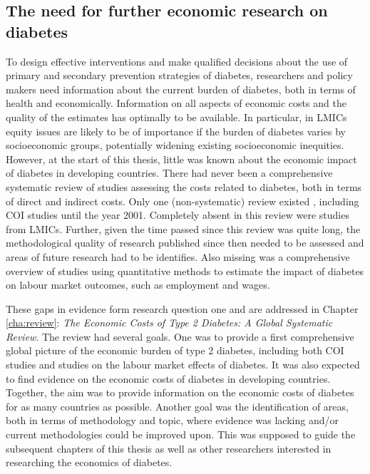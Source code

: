 \subsection{The need for further economic research on diabetes}

To design effective interventions and make qualified decisions about the use of primary and secondary prevention strategies of diabetes, researchers and policy makers need information about the current burden of diabetes, both in terms of health and economically. Information on all aspects of economic costs and the quality of the estimates has optimally to be available. In particular, in \acp{LMIC} equity issues are likely to be of importance if the burden of diabetes varies by socioeconomic groups, potentially widening existing socioeconomic inequities. However, at the start of this thesis, little was known about the economic impact of diabetes in developing countries. There had never been a comprehensive systematic review of studies assessing the costs related to diabetes, both in terms of direct and indirect costs. Only one (non-systematic) review existed \parencite{Ettaro2004}, including \ac{COI} studies  until the year 2001. Completely absent in this review were studies from \acp{LMIC}. Further, given the time passed since this review was quite long, the methodological quality of research published since then needed to be assessed and areas of future research had to be identifies. Also missing was a comprehensive overview of studies using quantitative methods to estimate the impact of diabetes on labour market outcomes, such as employment and wages.

These gaps in evidence form research question one and are addressed in Chapter \ref{cha:review}: \textit{The Economic Costs of Type 2 Diabetes: A Global Systematic Review}. The review had several goals. One was to provide a first comprehensive global picture of the economic burden of type 2 diabetes, including both \ac{COI} studies and studies on the labour market effects of diabetes. It was also expected to find evidence on the economic costs of diabetes in developing countries. Together, the aim was to provide information on the economic costs of diabetes for as many countries as possible. Another goal was the identification of areas, both in terms of methodology and topic, where evidence was lacking and/or current methodologies could be improved upon. This was supposed to guide the subsequent chapters of this thesis as well as other researchers interested in researching the economics of diabetes.

